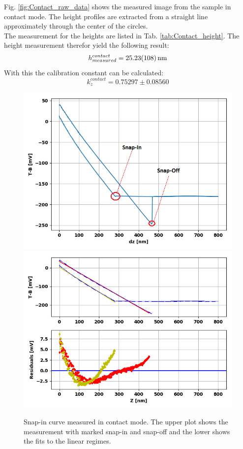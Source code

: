 \documentclass[%
 reprint,
amsmath,amssymb,
pra,
]{revtex4-1}
\begin{document}
Fig. \ref{fig:Contact_raw_data} shows the measured image from the sample in contact mode. The height profiles are extracted from a straight line approximately through the center of the circles. \\
The measurement for the heights are listed in Tab. \ref{tab:Contact_height}. The height measurement therefor yield the following result:
\begin{equation*}
h_{measured}^{contact} = \SI{25.23 \pm 1.08}{nm}
\end{equation*}
With this the calibration constant can be calculated:
\begin{equation*}
k_z^{contact} = 0.75297 \pm 0.08560
\end{equation*}

\begin{figure}
\centering
\includegraphics[scale=0.5]{Bilder/Contact_Mode/Snap_in_curve_marked.PNG}
\includegraphics[scale=0.5]{Bilder/Contact_Mode/Snap_in_curve_fit.PNG}
\caption{Snap-in curve measured in contact mode. The upper plot shows the measurement with marked snap-in and snap-off and the lower shows the fits to the linear regimes.}
\label{fig:Contact_snap_in}
\end{figure}
\end{document}
